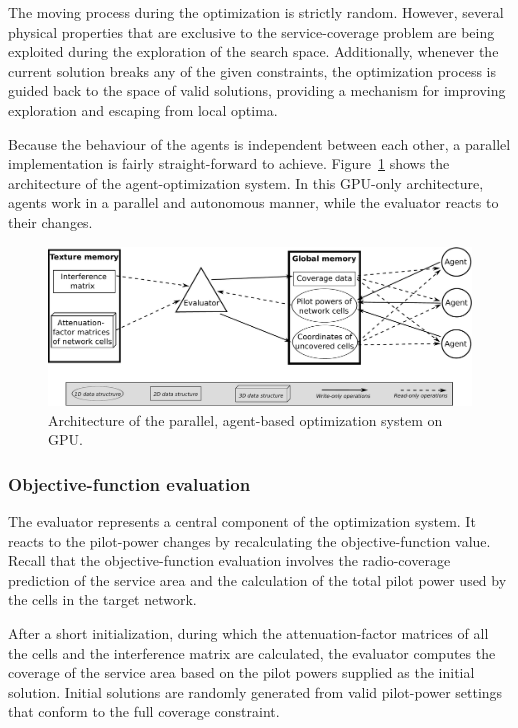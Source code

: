 The moving process during the optimization is strictly random. However,
several physical properties that are exclusive to the service-coverage
problem are being exploited during the exploration of the search space.
Additionally, whenever the current solution breaks any of the given
constraints, the optimization process is guided back to the space
of valid solutions, providing a mechanism for improving exploration
and escaping from local optima.

Because the behaviour of the agents is independent between each other,
a parallel implementation is fairly straight-forward to achieve. Figure~\ref{fig:06-Architecture_of_the_system_on_GPU}
shows the architecture of the agent-optimization system. In this GPU-only
architecture, agents work in a parallel and autonomous manner, while
the evaluator reacts to their changes.

\begin{figure}
\centering

\includegraphics[width=1\textwidth]{06-experimental_evaluation-service_coverage/img/architecture}

\caption{Architecture of the parallel, agent-based optimization system on GPU.\emph{\label{fig:06-Architecture_of_the_system_on_GPU}}}
\end{figure}



\subsubsection{Objective-function evaluation}

The evaluator represents a central component of the optimization system.
It reacts to the pilot-power changes by recalculating the objective-function
value. Recall that the objective-function evaluation involves the
radio-coverage prediction of the service area and the calculation
of the total pilot power used by the cells in the target network.

After a short initialization, during which the attenuation-factor
matrices of all the cells and the interference matrix are calculated,
the evaluator computes the coverage of the service area based on the
pilot powers supplied as the initial solution. Initial solutions are
randomly generated from valid pilot-power settings that conform to
the full coverage constraint.

